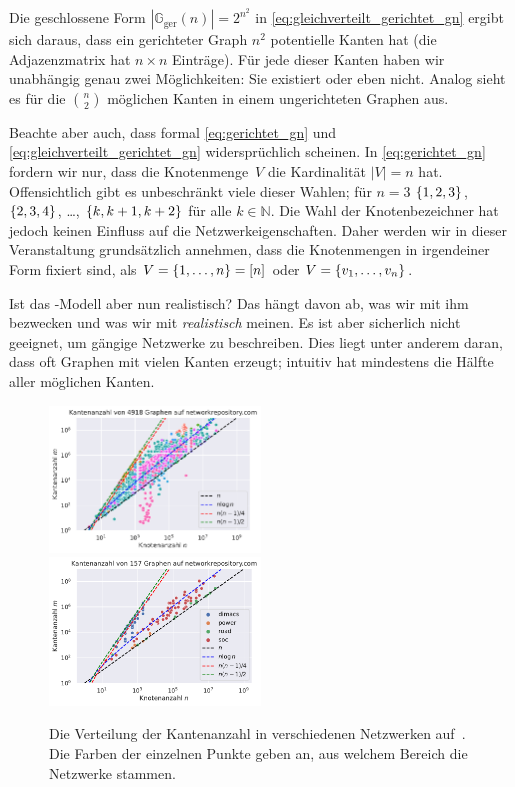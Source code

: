 Die geschlossene Form $| \mathbb G_\text{ger}(n) | = 2^{n^2}$ in \cref{eq:gleichverteilt_gerichtet_gn} ergibt sich daraus, dass ein gerichteter Graph $n^2$ potentielle Kanten hat (die Adjazenzmatrix hat $n \times n$ Einträge).
Für jede dieser Kanten haben wir unabhängig genau zwei Möglichkeiten: Sie existiert oder eben nicht.
Analog sieht es für die $\binom n 2$ möglichen Kanten in einem ungerichteten Graphen aus.

Beachte aber auch, dass formal \cref{eq:gerichtet_gn} und \cref{eq:gleichverteilt_gerichtet_gn} widersprüchlich scheinen.
In \cref{eq:gerichtet_gn} fordern wir nur, dass die Knotenmenge~$V$ die Kardinalität $|V| = n$ hat.
Offensichtlich gibt es unbeschränkt viele dieser Wahlen; für $n=3$ \zB $\left\{1,2,3\right\}$, $\left\{2,3,4\right\}$, \ldots, $\left\{k, k+1, k+2\right\}$ für alle $k \in \mathbb N$.
Die Wahl der Knotenbezeichner hat jedoch keinen Einfluss auf die Netzwerkeigenschaften.
Daher werden wir in dieser Veranstaltung grundsätzlich annehmen, dass die Knotenmengen in irgendeiner Form fixiert sind, \zB als $V = \left\{1, \ldots, n\right\} = [n]$ oder $V = \left\{v_1, \ldots, v_n\right\}$.

\bigskip

Ist das \Gn-Modell aber nun realistisch?
Das hängt davon ab, was wir mit ihm bezwecken und was wir mit \emph{realistisch} meinen.
Es ist aber sicherlich nicht geeignet, um gängige Netzwerke zu beschreiben.
Dies liegt unter anderem daran, dass \Gn oft Graphen mit vielen Kanten erzeugt;
intuitiv hat  mindestens die Hälfte aller möglichen Kanten.

\begin{figure}[t]
    \begin{center}
        \includegraphics[width=0.5\textwidth]{data/network-rep-edges.pdf}%
        \includegraphics[width=0.5\textwidth]{data/network-rep-edges-thin.pdf}%
    \end{center}
    \caption{
        Die Verteilung der Kantenanzahl in verschiedenen Netzwerken auf~\cite{networkrepository}.
        Die Farben der einzelnen Punkte geben an, aus welchem Bereich die Netzwerke stammen.
    }
    \label{fig:kantenanzahl}
\end{figure}



